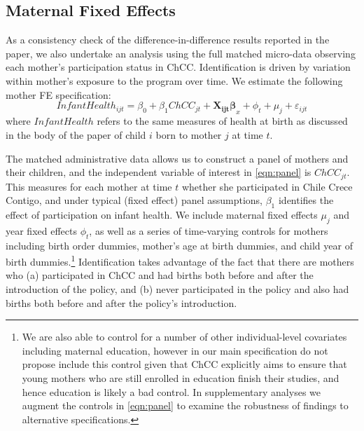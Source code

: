 \documentclass[12pt]{article}
\begin{document}
\begin{spacing}{1.4}
\section{Maternal Fixed Effects}
\label{MFE}
As a consistency check of the difference-in-difference results  
reported in the paper, we also undertake an analysis using the
full matched micro-data observing each mother's participation
status in ChCC.  Identification is driven by variation within
mother's exposure to the program over time.  We estimate the
following mother FE specification:
\begin{equation}
  \label{eqn:panel}
  Infant Health_{ijt} = \beta_0 + \beta_1 ChCC_{jt} + \bm{X_{ijt}\beta}_{x} + \phi_t + \mu_j + \varepsilon_{ijt}
\end{equation}
where $InfantHealth$ refers to the same measures of health at
birth as discussed in the body of the paper of child $i$ born
to mother $j$ at time $t$.

The matched administrative data allows us to construct a panel
of mothers and their children, and the independent variable of
interest in \ref{eqn:panel} is $ChCC_{jt}$.  This measures for
each mother at time $t$ whether she participated in Chile Crece
Contigo, and under typical (fixed effect) panel assumptions,
$\beta_1$ identifies the effect of participation on infant health.
We include maternal fixed effects $\mu_j$ and year fixed effects
$\phi_t$, as well as a series of time-varying controls for
mothers including birth order dummies, mother's age at birth
dummies, and child year of birth dummies.\footnote{We are also
  able to control for a number of other individual-level
  covariates including maternal education, however in our main
  specification do not propose include this control given that
  ChCC explicitly aims to ensure that young mothers who are still
  enrolled in education finish their studies, and hence education
  is likely a bad control.  In supplementary analyses we augment
  the controls in \ref{eqn:panel} to examine the robustness of
  findings to alternative specifications.}  Identification takes
advantage of the fact that there are mothers who (a) participated
in ChCC and had births both before and after the introduction of
the policy, and (b) never participated in the policy and also had
births both before and after the policy's introduction.


\end{spacing}
\end{document}
